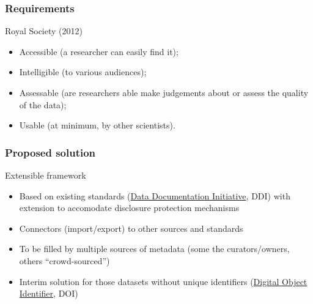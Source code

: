 \begin{frame}
\frametitle{Requirements}
\begin{block}{Royal Society (2012)}
\begin{itemize}
\item Accessible (a researcher can easily find it);
\item Intelligible (to various audiences);
\item Assessable (are researchers able make judgements about or
assess the quality of the data);
\item Usable (at minimum, by other scientists).
\end{itemize}
\end{block}
\end{frame}


\begin{frame}
\frametitle{Proposed solution}
\begin{block}{Extensible framework}
\begin{itemize}[<+->]
\item Based on existing standards (\href{http://www.ddialliance.org}{Data Documentation Initiative}, DDI) with extension to accomodate disclosure protection mechanisms
\item Connectors (import/export) to other sources and standards
\item To be filled by multiple sources of metadata (some the curators/owners, others ``crowd-sourced'')
\item Interim solution for those datasets without unique identifiers (\href{http://datacite.org/whatisdoi}{Digital Object Identifier}, DOI)
\end{itemize}
\end{block}
\end{frame}



